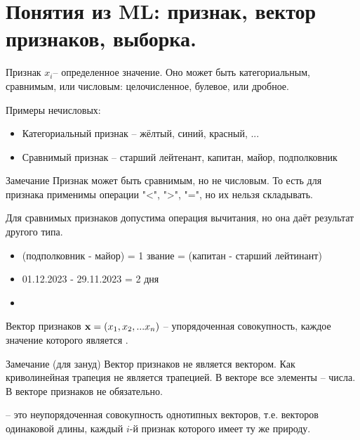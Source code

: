 \section{Понятия из ML: признак, вектор признаков, выборка.}\label{section:ml_defs}

 \begin{frame}{Признак}
 	\footnotesize
	 $x_i$-- определенное значение. 
	Оно может быть категориальным, сравнимым, или числовым: целочисленное, булевое, или дробное.
	
	Примеры нечисловых:
	\begin{itemize}
		\item Категориальный признак -- жёлтый, синий, красный, ...
		\item Сравнимый признак -- старший лейтенант, капитан, майор, подполковник
	\end{itemize}
	\begin{block}{Замечание}
		Признак может быть сравнимым, но не числовым. 
		То есть для признака применимы операции "<", ">", "=", но их нельзя складывать.
		
		Для сравнимых признаков допустима операция вычитания, но она даёт результат другого типа.
		\begin{itemize}
			\item (подполковник - майор) = 1 звание = (капитан - старший лейтинант)
			\item 01.12.2023 - 29.11.2023 = 2 дня
			\item {}
		\end{itemize}
	\end{block}

\end{frame}
\begin{frame}{Вектор признаков}
	 $\bold x = (x_1, x_2, ... x_n)$ -- упорядоченная совокупность, каждое значение которого является . 
	
	\begin{block}{Замечание (для зануд)}
		Вектор признаков не является вектором. Как криволинейная трапеция не является трапецией.	
		В векторе все элементы -- числа. В векторе признаков не обязательно.
	\end{block}

	 -- это неупорядоченная совокупность однотипных векторов, 
	т.е. векторов одинаковой длины, каждый $i$-й признак которого имеет ту же природу.
\end{frame}

